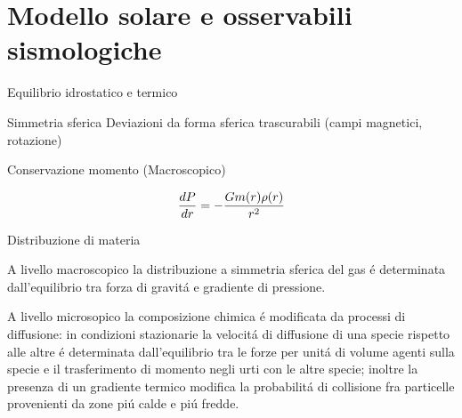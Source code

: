 \documentclass[10pt,xcolor={usenames},fleqn,mathserif,serif]{beamer}
\begin{document}
\part{Modello solare e osservabili sismologiche}\label{part:MSS}
\frame{\partpage}




\begin{frame}{Equilibrio idrostatico e termico}


\begin{block}{Simmetria sferica}
Deviazioni da forma sferica trascurabili (campi magnetici, rotazione)
\end{block}


\begin{block}{Conservazione momento (Macroscopico)}

\begin{equation*}
\TDy{r}{P}=-\frac{Gm(r)\rho(r)}{r^2}%
\end{equation*}

\end{block}



\end{frame}

\begin{wordonframe}{Distribuzione di materia}

A livello macroscopico la distribuzione a simmetria sferica del gas \'e determinata dall'equilibrio tra forza di gravit\'a e gradiente di pressione.

A livello microsopico la composizione chimica \'e modificata da processi di diffusione: in condizioni stazionarie la velocit\'a di diffusione di una specie rispetto alle altre \'e determinata dall'equilibrio tra le forze per unit\'a di volume agenti sulla specie e il trasferimento di momento negli urti con le altre specie; inoltre la presenza di un gradiente termico modifica la probabilit\'a di collisione fra particelle provenienti da zone pi\'u calde e pi\'u fredde.

\end{wordonframe}
\end{document}

